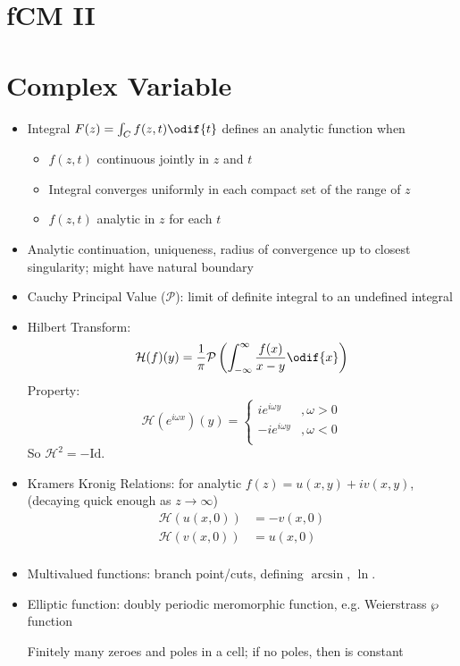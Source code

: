


\section*{fCM \hfill II}

\section{Complex Variable}
\begin{itemize}
\item Integral $F(z) = \int_C f(z,t) \odif{t}$ defines an analytic function when 
\begin{itemize}
    \item $f(z,t)$ continuous jointly in $z$ and $t$
    \item Integral converges uniformly in each compact set of the range of $z$
    \item $f(z,t)$ analytic in $z$ for each $t$
\end{itemize}
\item Analytic continuation, uniqueness, radius of convergence up to closest singularity; might have natural boundary
\item Cauchy Principal Value ($\mathcal{P}$): limit of definite integral to an undefined integral
\item Hilbert Transform: 
\[\mathcal{H}(f)(y) = \frac{1}{\pi} \mathcal{P} \left(\int_{-\infty}^\infty \frac{f(x)}{x-y} \odif{x}\right)\]
Property: \[\mathcal{H}(e^{i\omega x})(y) = \begin{cases}
    ie^{i\omega y} &, \omega> 0\\
    -ie^{i\omega y}&, \omega< 0\\
\end{cases} \]
So $\mathcal{H}^2 = -\text{Id}$.
\item Kramers Kronig Relations: for analytic $f(z) = u(x,y) + iv(x,y)$, (decaying quick enough as $z \to \infty$) \begin{align*}
    \mathcal{H}(u(x,0))&=-v(x,0) \\
    \mathcal{H}(v(x,0))&=u(x,0) \\
\end{align*}
\item Multivalued functions: branch point/cuts, defining $\arcsin$, $\ln$.
\item Elliptic function: doubly periodic meromorphic function, e.g. Weierstrass $\wp$ function

Finitely many zeroes and poles in a cell; if no poles, then is constant
\end{itemize}
